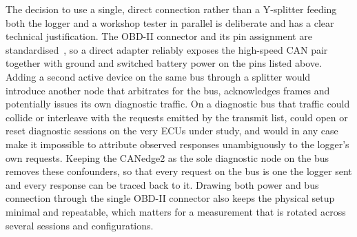 \documentclass[11pt,a4paper,oneside,parskip=half]{scrreprt}
\begin{document}
The decision to use a single, direct connection rather than a Y-splitter feeding both the logger and a workshop tester in parallel is deliberate and has a clear technical justification. The OBD-II connector and its pin assignment are standardised~\cite{saej1962}, so a direct adapter reliably exposes the high-speed CAN pair together with ground and switched battery power on the pins listed above. Adding a second active device on the same bus through a splitter would introduce another node that arbitrates for the bus, acknowledges frames and potentially issues its own diagnostic traffic. On a diagnostic bus that traffic could collide or interleave with the requests emitted by the transmit list, could open or reset diagnostic sessions on the very ECUs under study, and would in any case make it impossible to attribute observed responses unambiguously to the logger's own requests. Keeping the CANedge2 as the sole diagnostic node on the bus removes these confounders, so that every request on the bus is one the logger sent and every response can be traced back to it. Drawing both power and bus connection through the single OBD-II connector also keeps the physical setup minimal and repeatable, which matters for a measurement that is rotated across several sessions and configurations.
\end{document}
